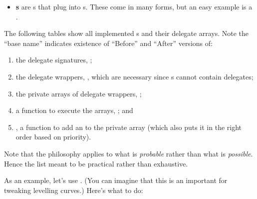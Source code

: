 \begin{itemize}
{\begin{center}
		\end{center}		 
		}
	\item{\textbf{s} are s that plug into s. These come in many forms, but an easy example is a . }
\end{itemize}









The following tables show all implemented s and their delegate arrays. Note the ``base name'' indicates existence of ``Before'' and ``After'' versions of:

\begin{enumerate}
	\item{the delegate signatures, ;}
	\item{the delegate wrappers, , which are necessary since s cannot contain delegates;}
	\item{the private arrays of delegate wrappers, ;}
	\item{a function to execute the arrays, ; and}
	\item{, a function to add an  to the private array  (which also puts it in the right order based on priority).}
\end{enumerate}

\noindent Note that the philosophy applies to what is \textit{probable} rather than what is \textit{possible}. Hence the list meant to be practical rather than exhaustive.






As an example, let's use . (You can imagine that this is an important  for tweaking levelling curves.) Here's what to do:\\

